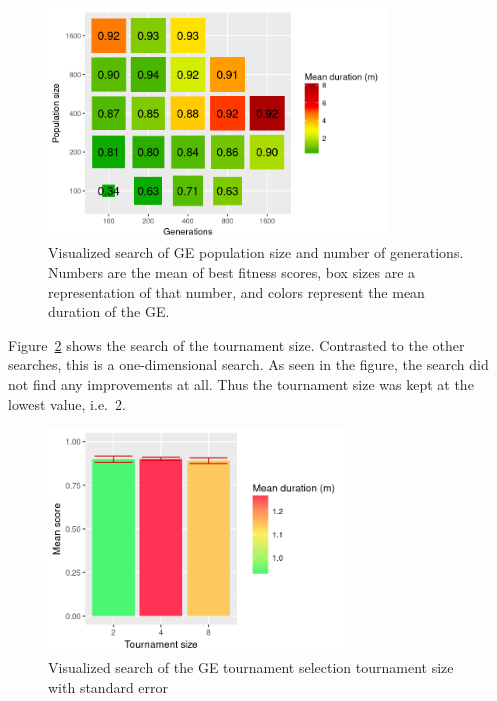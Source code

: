 \begin{figure}
    \centering
    \includegraphics[width=0.8\textwidth]{figures/ge-size-sampling}
    \caption[Visualized search of GE population size and number of generations]{Visualized search of GE population size and number of generations. Numbers are the mean of best fitness scores, box sizes are a representation of that number, and colors represent the mean duration of the GE.}
    \label{fig:size-sampling}
\end{figure}

Figure~\ref{fig:tournament-sampling} shows the search of the tournament size.
Contrasted to the other searches, this is a one-dimensional search.
As seen in the figure, the search did not find any improvements at all.
Thus the tournament size was kept at the lowest value, i.e.\ 2.

\begin{figure}
    \centering
    \includegraphics[width=0.7\textwidth]{figures/ge-tournament-sampling}
    \caption[Visualized search of the GE tournament selection tournament size]{Visualized search of the GE tournament selection tournament size with standard error}
    \label{fig:tournament-sampling}
\end{figure}

